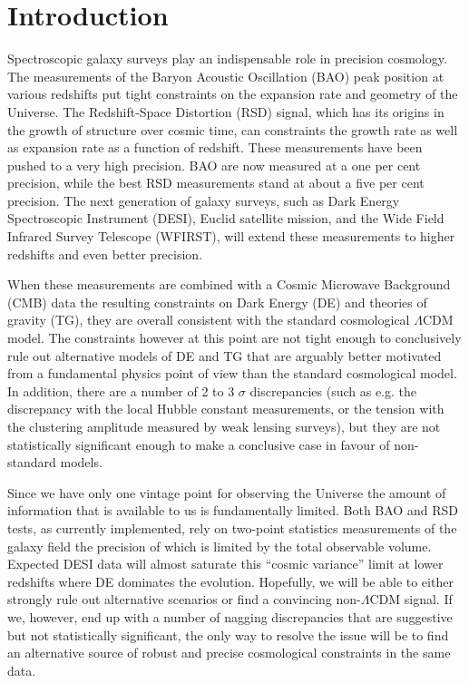 
\newpage

\section{Introduction}
Spectroscopic galaxy surveys play an indispensable role in precision cosmology. 
The measurements of the Baryon Acoustic Oscillation (BAO) peak position at various redshifts put tight constraints
on the expansion rate and geometry of the Universe.
The Redshift-Space Distortion (RSD) signal, which has its origins in the growth of structure over cosmic time,
can constraints the growth rate as well as expansion rate as a function of redshift.
These measurements have been pushed to a very high precision. BAO are now measured at a one per cent precision, 
while the best RSD measurements stand at about a five per cent precision.
The next generation of galaxy surveys, such as Dark Energy Spectroscopic Instrument (DESI), Euclid satellite mission,
and the Wide Field Infrared Survey Telescope (WFIRST), will extend these measurements to higher redshifts and even better precision.

When these measurements are combined with a Cosmic Microwave Background (CMB) data the resulting constraints
on Dark Energy (DE) and theories of gravity (TG), they are overall consistent with the standard cosmological 
$\Lambda$CDM model. The constraints however at this point are not tight enough to conclusively rule out alternative
models of DE and TG that are arguably better motivated from a fundamental physics point of view than the standard cosmological model.
In addition, there are a number of 2 to 3 $\sigma$ discrepancies (such as e.g. the discrepancy with the local Hubble
constant measurements, or the tension with the clustering amplitude measured by weak lensing surveys), but they are
not statistically significant enough to make a conclusive case in favour of non-standard models.
 
Since we have only one vintage point for observing the Universe the amount of information that is 
available to us is fundamentally limited. Both BAO and RSD tests, as currently implemented, rely on
two-point statistics measurements of the galaxy field the precision of which is limited by the total 
observable volume. Expected DESI data will almost saturate this ``cosmic variance'' limit at lower redshifts
where DE dominates the evolution. Hopefully, we will be able to either strongly rule out alternative scenarios or
find a convincing non-$\Lambda$CDM signal. If we, however, end up with a number of nagging discrepancies that are
suggestive but not statistically significant, the only way to resolve the issue will be to find an alternative source
of robust and precise cosmological constraints in the same data.

